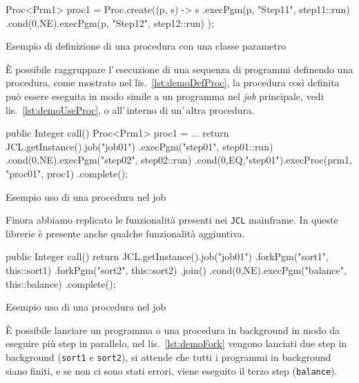 \begin{elisting}[!htb]
\begin{javacode}
    Proc<Prm1> proc1 = Proc.create((p, s) -> s
        .execPgm(p, "Step11", step11::run)
        .cond(0,NE).execPgm(p, "Step12", step12::run)
    );
\end{javacode}
\caption{Esempio di definizione di una procedura con una classe parametro}
\label{lst:demoDefProc}
\end{elisting}
È possibile raggruppare l'\,esecuzione di una sequenza di programmi definendo
una procedura, come mostrato nel lis.~\ref{lst:demoDefProc}, la procedura così
definita può essere eseguita in modo simile a un programma nel \textit{job}
principale, vedi lis.~\ref{lst:demoUseProc}, o all'\,interno di un'\,altra
procedura.
\begin{elisting}[!htb]
\begin{javacode}
public Integer call() {
    Proc<Prm1> proc1 = ...
    return JCL.getInstance().job("job01")
        .execPgm("step01", step01::run)
        .cond(0,NE).execPgm("step02", step02::run)
        .cond(0,EQ,"step01").execProc(prm1, "proc01", proc1)
        .complete();
}
\end{javacode}
\caption{Esempio uso di una procedura nel job}
\label{lst:demoUseProc}
\end{elisting}

Finora abbiamo replicato le funzionalità presenti nei \texttt{JCL} mainframe.
In queste librerie è presente anche qualche funzionalità aggiuntiva.

\begin{elisting}[!htb]
\begin{javacode}
public Integer call() {
    return JCL.getInstance().job("job01")
        .forkPgm("sort1", this::sort1)
        .forkPgm("sort2", this::sort2)
        .join()
        .cond(0,NE).execPgm("balance", this::balance)
        .complete();
}
\end{javacode}
\caption{Esempio uso di una procedura nel job}
\label{lst:demoFork}
\end{elisting}
È possibile lanciare un programma o una procedura in background in modo da
eseguire più step in parallelo, nel lis.~\ref{lst:demoFork} vengono lanciati due
step in background (\texttt{sort1} e \texttt{sort2}), si attende che tutti i
programmi in background siano finiti, e se non ci sono stati errori, viene
eseguito il terzo step (\texttt{balance}).


